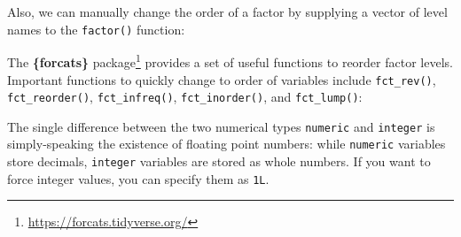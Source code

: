 \documentclass[
]{krantz}
\makeatletter
\newenvironment{Shaded}{\begin{snugshade}}{\end{snugshade}}
\newcommand{\AttributeTok}[1]{\textcolor[rgb]{0.61,0.61,0.61}{#1}}
\newcommand{\DocumentationTok}[1]{\textcolor[rgb]{0.37,0.37,0.37}{\textbf{\textit{#1}}}}
\newcommand{\FunctionTok}[1]{\textcolor[rgb]{0,0,0}{#1}}
\newcommand{\NormalTok}[1]{#1}
\newcommand{\OtherTok}[1]{\textcolor[rgb]{0.37,0.37,0.37}{#1}}
\newcommand{\SpecialCharTok}[1]{\textcolor[rgb]{0,0,0}{#1}}
\newcommand{\StringTok}[1]{\textcolor[rgb]{0.5,0.5,0.5}{#1}}
\renewcommand{\href}[2]{#2\footnote{\url{#1}}}
\newenvironment{kframe}{%
\medskip{}
\setlength{\fboxsep}{.8em}
 \def\at@end@of@kframe{}%
 \ifinner\ifhmode%
  \def\at@end@of@kframe{\end{minipage}}%
  \begin{minipage}{\columnwidth}%
 \fi\fi%
 \def\FrameCommand##1{\hskip\@totalleftmargin \hskip-\fboxsep
 \colorbox{shadecolor}{##1}\hskip-\fboxsep
     \hskip-\linewidth \hskip-\@totalleftmargin \hskip\columnwidth}%
 \MakeFramed {\advance\hsize-\width
   \@totalleftmargin\z@ \linewidth\hsize
   \@setminipage}}%
 {\par\unskip\endMakeFramed%
 \at@end@of@kframe}
\renewenvironment{Shaded}{\begin{kframe}}{\end{kframe}}
\makeatother
\begin{document}
Also, we can manually change the order of a factor by supplying a vector of level names to the \texttt{factor()} function:

\begin{Shaded}
\end{Shaded}

The \href{https://forcats.tidyverse.org/}{\textbf{\{forcats\}} package} \citep{forcats} provides a set of useful functions to reorder factor levels. Important functions to quickly change to order of variables include \texttt{fct\_rev()}, \texttt{fct\_reorder()}, \texttt{fct\_infreq()}, \texttt{fct\_inorder()}, and \texttt{fct\_lump()}:

\begin{Shaded}
\end{Shaded}

The single difference between the two numerical types \texttt{numeric} and \texttt{integer} is simply-speaking the existence of floating point numbers: while \texttt{numeric} variables store decimals, \texttt{integer} variables are stored as whole numbers. If you want to force integer values, you can specify them as \texttt{1L}.
\end{document}
